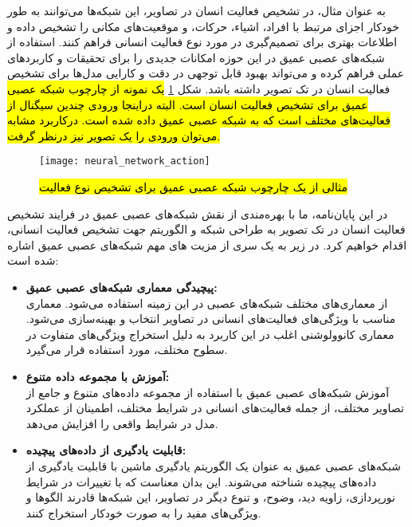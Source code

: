 به عنوان مثال، در تشخیص فعالیت انسان در تصاویر، این شبکه‌ها می‌توانند به طور خودکار اجزای مرتبط با افراد، اشیاء، حرکات، و موقعیت‌های مکانی را تشخیص داده و اطلاعات بهتری برای تصمیم‌گیری در مورد نوع فعالیت انسانی فراهم کنند.
استفاده از شبکه‌های عصبی عمیق در این حوزه امکانات جدیدی را برای تحقیقات و کاربردهای عملی فراهم کرده و می‌تواند بهبود قابل توجهی در دقت و کارایی مدل‌ها برای تشخیص فعالیت انسان در تک تصویر داشته باشد. شکل %
\ref{fig:neural_network_action_first}
\hl{
یک نمونه از چارچوب شبکه عصبی عمیق برای تشخیص فعالیت انسان است. البته دراینجا ورودی چندین سیگنال از فعالیت‌های مختلف است که به شبکه عصبی عمیق داده شده است. درکاربرد مشابه می‌توان ورودی را یک تصویر نیز درنظر گرفت.
}
\begin{figure}[ht]
	\centerline{\texttt{[image: neural\_network\_action]}}
	\caption{
		\hl{
		مثالی از یک چارچوب شبکه عصبی عمیق برای تشخیص نوع فعالیت
		}
		\cite{WinNT}
	}
	\label{fig:neural_network_action_first}
\end{figure}

در این پایان‌نامه، ما با بهره‌مندی از نقش شبکه‌های عصبی عمیق در فرایند تشخیص فعالیت انسان در تک تصویر به طراحی شبکه و الگوریتم جهت تشخیص فعالیت انسانی، اقدام خواهیم کرد. در زیر به یک سری از مزیت های مهم شبکه‌های عصبی عمیق اشاره شده است:
\begin{itemize}
	\item \textbf{پیچیدگی معماری شبکه‌های عصبی عمیق:}\\
از معماری‌های مختلف شبکه‌های عصبی در این زمینه استفاده می‌شود. معماری مناسب با ویژگی‌های فعالیت‌های انسانی در تصاویر انتخاب و بهینه‌سازی می‌شود. معماری کانوولوشنی%
اغلب در این کاربرد به دلیل استخراج ویژگی‌های متفاوت در سطوح مختلف، مورد استفاده قرار می‌گیرد. 

	\item \textbf{آموزش با مجموعه داده متنوع:}\\
آموزش شبکه‌های عصبی عمیق با استفاده از مجموعه داده‌های متنوع و جامع از تصاویر مختلف، از جمله فعالیت‌های انسانی در شرایط مختلف، اطمینان از عملکرد مدل در شرایط واقعی را افزایش می‌دهد.

\item \textbf{قابلیت یادگیری از داده‌های پیچیده:}\\
شبکه‌های عصبی عمیق به عنوان یک الگوریتم یادگیری ماشین با قابلیت یادگیری از داده‌های پیچیده شناخته می‌شوند. این بدان معناست که با تغییرات در شرایط نورپردازی، زاویه دید، وضوح، و تنوع دیگر در تصاویر، این شبکه‌ها قادرند الگوها و ویژگی‌های مفید را به صورت خودکار استخراج کنند.
\end{itemize}

